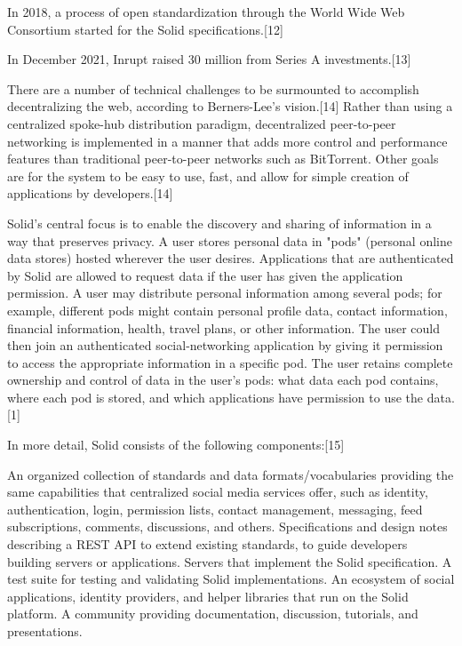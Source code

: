In 2018, a process of open standardization through the World Wide Web Consortium started for the Solid specifications.[12]

In December 2021, Inrupt raised 30 million from Series A investments.[13]

There are a number of technical challenges to be surmounted to accomplish decentralizing the web, according to Berners-Lee's vision.[14] Rather than using a centralized spoke-hub distribution paradigm, decentralized peer-to-peer networking is implemented in a manner that adds more control and performance features than traditional peer-to-peer networks such as BitTorrent. Other goals are for the system to be easy to use, fast, and allow for simple creation of applications by developers.[14]

Solid's central focus is to enable the discovery and sharing of information in a way that preserves privacy. A user stores personal data in "pods" (personal online data stores) hosted wherever the user desires. Applications that are authenticated by Solid are allowed to request data if the user has given the application permission. A user may distribute personal information among several pods; for example, different pods might contain personal profile data, contact information, financial information, health, travel plans, or other information. The user could then join an authenticated social-networking application by giving it permission to access the appropriate information in a specific pod. The user retains complete ownership and control of data in the user's pods: what data each pod contains, where each pod is stored, and which applications have permission to use the data.[1]

In more detail, Solid consists of the following components:[15]

An organized collection of standards and data formats/vocabularies providing the same capabilities that centralized social media services offer, such as identity, authentication, login, permission lists, contact management, messaging, feed subscriptions, comments, discussions, and others.
Specifications and design notes describing a REST API to extend existing standards, to guide developers building servers or applications.
Servers that implement the Solid specification.
A test suite for testing and validating Solid implementations.
An ecosystem of social applications, identity providers, and helper libraries that run on the Solid platform.
A community providing documentation, discussion, tutorials, and presentations.


